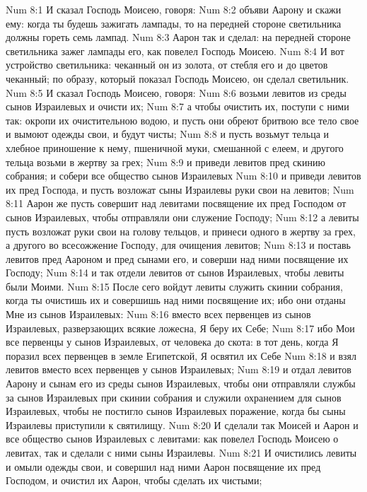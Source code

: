 \vs Num 8:1 И сказал Господь Моисею, говоря:
\vs Num 8:2 объяви Аарону и скажи ему: когда ты будешь зажигать лампады, то на передней стороне светильника должны гореть семь лампад.
\vs Num 8:3 Аарон так и сделал: на передней стороне светильника зажег лампады его, как повелел Господь Моисею.
\vs Num 8:4 И вот устройство светильника: чеканный он из золота, от стебля его и до цветов чеканный; по образу, который показал Господь Моисею, он сделал светильник.
\rsbpar\vs Num 8:5 И сказал Господь Моисею, говоря:
\vs Num 8:6 возьми левитов из среды сынов Израилевых и очисти их;
\vs Num 8:7 а чтобы очистить их, поступи с ними так: окропи их очистительною водою, и пусть они обреют бритвою все тело свое и вымоют одежды свои, и будут чисты;
\vs Num 8:8 и пусть возьмут тельца и хлебное приношение к нему, пшеничной муки, смешанной с елеем, и другого тельца возьми в жертву за грех;
\vs Num 8:9 и приведи левитов пред скинию собрания; и собери все общество сынов Израилевых
\vs Num 8:10 и приведи левитов их пред Господа, и пусть возложат сыны Израилевы руки свои на левитов;
\vs Num 8:11 Аарон же пусть совершит над левитами посвящение их пред Господом от сынов Израилевых, чтобы отправляли они служение Господу;
\vs Num 8:12 а левиты пусть возложат руки свои на голову тельцов, и принеси одного в жертву за грех, а другого во всесожжение Господу, для очищения левитов;
\vs Num 8:13 и поставь левитов пред Аароном и пред сынами его, и соверши над ними посвящение их Господу;
\vs Num 8:14 и так отдели левитов от сынов Израилевых, чтобы левиты были Моими.
\vs Num 8:15 После сего войдут левиты служить скинии собрания, когда ты очистишь их и совершишь над ними посвящение их; ибо они отданы Мне из сынов Израилевых:
\vs Num 8:16 вместо всех первенцев из сынов Израилевых, разверзающих всякие ложесна, Я беру их Себе;
\vs Num 8:17 ибо Мои все первенцы у сынов Израилевых, от человека до скота: в тот день, когда Я поразил всех первенцев в земле Египетской, Я освятил их Себе
\vs Num 8:18 и взял левитов вместо всех первенцев у сынов Израилевых;
\vs Num 8:19 и отдал левитов Аарону и сынам его из среды сынов Израилевых, чтобы они отправляли службы за сынов Израилевых при скинии собрания и служили охранением для сынов Израилевых, чтобы не постигло сынов Израилевых поражение, когда бы сыны Израилевы приступили к святилищу.
\vs Num 8:20 И сделали так Моисей и Аарон и все общество сынов Израилевых с левитами: как повелел Господь Моисею о левитах, так и сделали с ними сыны Израилевы.
\vs Num 8:21 И очистились левиты и омыли одежды свои, и совершил над ними Аарон посвящение их пред Господом, и очистил их Аарон, чтобы сделать их чистыми;
